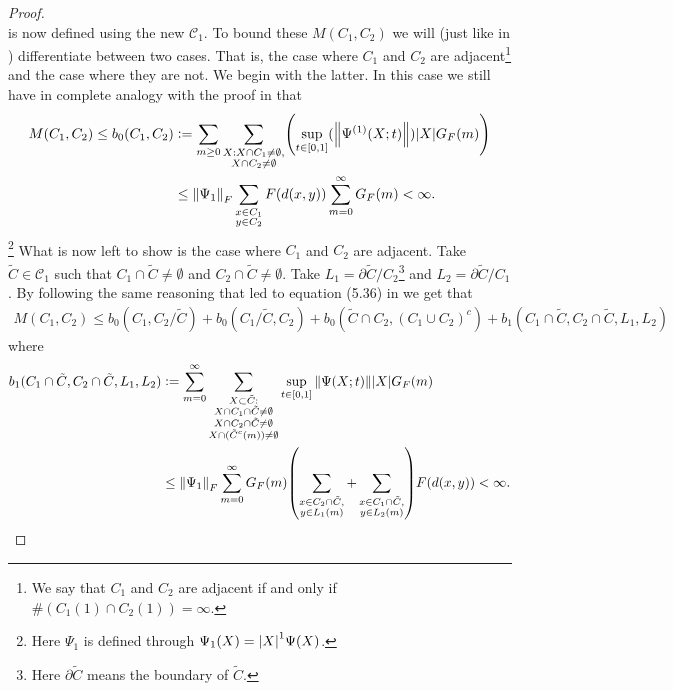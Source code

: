 \documentclass[12pt,a4paper,twoside]{article}
\newcommand{\defeq}{\vcentcolon=}
\let\originalleft\left
\let\originalright\right
\renewcommand{\left}{\mathopen{}\mathclose\bgroup\originalleft}
\renewcommand{\right}{\aftergroup\egroup\originalright}
\theoremstyle{definition}
\numberwithin{equation}{section}
\begin{document}
\begin{proof}
\begin{equation}
	\end{equation}
	is now defined using the new $\mathcal{C}_1$. To bound these $M(C_1,C_2)$ we will (just like in \cite{ogata2021h3gmathbb}) differentiate between two cases. That is, the case where $C_1$ and $C_2$ are adjacent\footnote{We say that $C_1$ and $C_2$ are adjacent if and only if $\#(C_1(1)\cap C_2(1))=\infty$.} and the case where they are not. We begin with the latter. In this case we still have in complete analogy with the proof in \cite{ogata2021h3gmathbb} that
	\begin{align}
		M(C_1,C_2)\leq b_0(C_1,C_2) &\defeq \sum_{m\geq 0}\sum_{\substack{X:X\cap C_1\neq\emptyset,\\X\cap C_2\neq\emptyset}}\left(\sup_{t\in[0,1]}(\norm{\Psi^{(1)}(X;t)})\abs{X}G_F(m)\right)\\
		&\leq \norm{\Psi_1}_F\sum_{\substack{x\in C_1\\y\in C_2}}F(d(x,y))\sum_{m=0}^\infty G_F(m)<\infty.
	\end{align}
	\footnote{Here $\Psi_1$ is defined through $\Psi_1(X)=\abs{X}^1 \Psi(X)$.} What is now left to show is the case where $C_1$ and $C_2$ are adjacent. Take $\tilde{C}\in\mathcal{C}_1$ such that $C_1\cap\tilde{C}\neq\emptyset$ and $C_2\cap\tilde{C}\neq\emptyset$. Take $L_1=\partial\tilde{C}/C_2$\footnote{Here $\partial \tilde{C}$ means the boundary of $\tilde C$.} and $L_2=\partial\tilde{C}/C_1$. By following the same reasoning that led to equation (5.36) in \cite{ogata2021h3gmathbb} we get that
	\begin{align}
		M(C_1,C_2)\leq b_0(C_1,C_2/\tilde{C})+b_0(C_1/\tilde{C},C_2)+b_0(\tilde{C}\cap C_2,(C_1\cup C_2)^c)+b_1(C_1\cap\tilde{C},C_2\cap\tilde{C},L_1,L_2)
	\end{align}
	where
	\begin{align}
		b_1(C_1\cap\tilde{C},C_2\cap\tilde{C},L_1,L_2)&\defeq\sum_{m=0}^\infty \sum_{\substack{X\subset \tilde{C}:\\ X\cap C_1\cap\tilde{C}\neq\emptyset\\X\cap C_2\cap\tilde{C}\neq\emptyset\\ X\cap (\tilde{C}^c(m))\neq\emptyset}}\sup_{t\in[0,1]}\norm{\Psi(X;t)}\abs{X}G_F(m)\\
		&\leq \norm{\Psi_1}_F\sum_{m=0}^{\infty}G_F(m)\left(\sum_{\substack{x\in C_2\cap\tilde{C},\\y\in L_1(m)}}+\sum_{\substack{x\in C_1\cap\tilde{C},\\y\in L_2(m)}}\right)F(d(x,y))<\infty.
	\end{align}

\end{proof}
\end{document}
